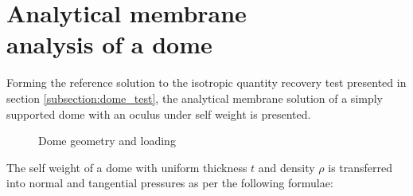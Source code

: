 
\chapter[Analytical membrane analysis of a dome]{Analytical membrane\\ analysis of a dome}
\label{app:Analytical membrane analysis of dome}
\renewcommand{\Thema}{Analytical membrane analysis of a dome}

Forming the reference solution to the isotropic quantity recovery test presented in section \ref{subsection:dome_test}, the analytical membrane solution of a simply supported dome with an oculus under self weight is presented.

\begin{figure}[H]
	\caption{\label{App3_dome}Dome geometry and loading}
\end{figure}

The self weight of a dome with uniform thickness $t$ and density $\rho$ is transferred into normal and tangential pressures as per the following formulae:

